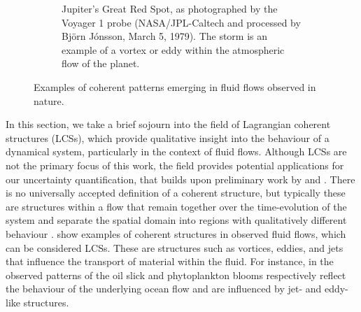 \begin{figure}
\begin{center}
\begin{subfigure}[t]{\textwidth}
			\caption{Jupiter's Great Red Spot, as photographed by the Voyager 1 probe (NASA/JPL-Caltech and processed by Bj\"{o}rn J\'{o}nsson, March 5, 1979).
			The storm is an example of a vortex or eddy within the atmospheric flow of the planet.}
		\end{subfigure}
		\caption{Examples of coherent patterns emerging in fluid flows observed in nature.}
		\label{fig:lcs_examples}
	\end{center}
\end{figure}

In this section, we take a brief sojourn into the field of Lagrangian coherent structures (LCSs), which provide qualitative insight into the behaviour of a dynamical system, particularly in the context of fluid flows.
Although LCSs are not the primary focus of this work, the field provides potential applications for our uncertainty quantification, that builds upon preliminary work by \citet{Balasuriya_2020_StochasticSensitivityComputable,Balasuriya_2020_UncertaintyFinitetimeLyapunov} and \citet{BadzaEtAl_2023_HowSensitiveAre}.
There is no universally accepted definition of a coherent structure, but typically these are structures within a flow that remain together over the time-evolution of the system and separate the spatial domain into regions with qualitatively different behaviour \citep{BalasuriyaEtAl_2018_GeneralizedLagrangianCoherent}.
 show examples of coherent structures in observed fluid flows, which can be considered LCSs.
These are structures such as vortices, eddies, and jets that influence the transport of material within the fluid.
For instance, in  the observed patterns of the oil slick and phytoplankton blooms respectively reflect the behaviour of the underlying ocean flow and are influenced by jet- and eddy-like structures.

